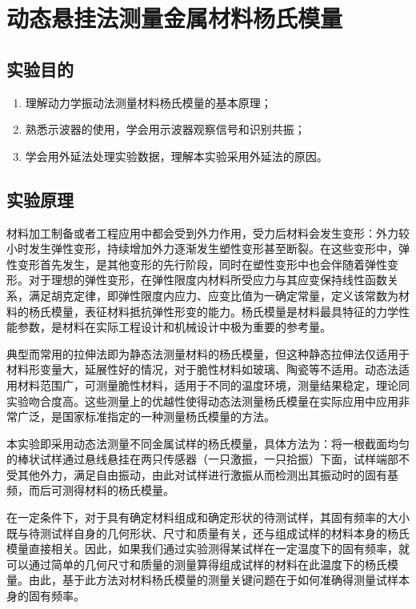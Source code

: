 \chapter{动态悬挂法测量金属材料杨氏模量}
\section{实验目的}
    \begin{enumerate}
        \item 理解动力学振动法测量材料杨氏模量的基本原理；
        \item 熟悉示波器的使用，学会用示波器观察信号和识别共振； 
        \item 学会用外延法处理实验数据，理解本实验采用外延法的原因。
    \end{enumerate}
\section{实验原理}%
    材料加工制备或者工程应用中都会受到外力作用，受力后材料会发生变形：外力较小时发生弹性变形，持续增加外力逐渐发生塑性变形甚至断裂。在这些变形中，弹性变形首先发生，是其他变形的先行阶段，同时在塑性变形中也会伴随着弹性变形。对于理想的弹性变形，在弹性限度内材料所受应力与其应变保持线性函数关系，满足胡克定律，即弹性限度内应力、应变比值为一确定常量，定义该常数为材料的杨氏模量，表征材料抵抗弹性形变的能力。杨氏模量是材料最具特征的力学性能参数，是材料在实际工程设计和机械设计中极为重要的参考量。\par
    典型而常用的拉伸法即为静态法测量材料的杨氏模量，但这种静态拉伸法仅适用于材料形变量大，延展性好的情况，对于脆性材料如玻璃、陶瓷等不适用。动态法适用材料范围广，可测量脆性材料，适用于不同的温度环境，测量结果稳定，理论同实验吻合度高。这些测量上的优越性使得动态法测量杨氏模量在实际应用中应用非常广泛，是国家标准指定的一种测量杨氏模量的方法。\par
    本实验即采用动态法测量不同金属试样的杨氏模量，具体方法为：将一根截面均匀的棒状试样通过悬线悬挂在两只传感器（一只激振，一只拾振）下面，试样端部不受其他外力，满足自由振动，由此对试样进行激振从而检测出其振动时的固有基频，而后可测得材料的杨氏模量。\par
    在一定条件下，对于具有确定材料组成和确定形状的待测试样，其固有频率的大小既与待测试样自身的几何形状、尺寸和质量有关，还与组成试样的材料本身的杨氏模量直接相关。因此，如果我们通过实验测得某试样在一定温度下的固有频率，就可以通过简单的几何尺寸和质量的测量算得组成试样的材料在此温度下的杨氏模量。由此，基于此方法对材料杨氏模量的测量关键问题在于如何准确得测量试样本身的固有频率。\par

